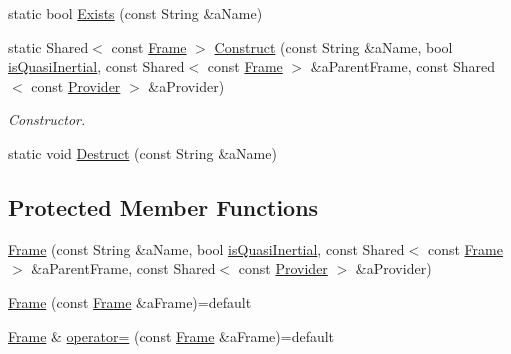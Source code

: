 \begin{DoxyCompactItemize}
\item 
static bool \hyperlink{classlibrary_1_1physics_1_1coord_1_1_frame_aa63cd17cfaf963543a34a15a18c84d40}{Exists} (const String \&a\+Name)
\item 
static Shared$<$ const \hyperlink{classlibrary_1_1physics_1_1coord_1_1_frame}{Frame} $>$ \hyperlink{classlibrary_1_1physics_1_1coord_1_1_frame_acdadad4d650b63c1d4ad05d5268e0b79}{Construct} (const String \&a\+Name, bool \hyperlink{classlibrary_1_1physics_1_1coord_1_1_frame_a894d1ac6152e28dbb749058ca6ffd663}{is\+Quasi\+Inertial}, const Shared$<$ const \hyperlink{classlibrary_1_1physics_1_1coord_1_1_frame}{Frame} $>$ \&a\+Parent\+Frame, const Shared$<$ const \hyperlink{classlibrary_1_1physics_1_1coord_1_1frame_1_1_provider}{Provider} $>$ \&a\+Provider)
\begin{DoxyCompactList}\small\item\em Constructor. \end{DoxyCompactList}\item 
static void \hyperlink{classlibrary_1_1physics_1_1coord_1_1_frame_a2d4229290a0332c70240ebc8b02bd132}{Destruct} (const String \&a\+Name)
\end{DoxyCompactItemize}
\subsection*{Protected Member Functions}
\begin{DoxyCompactItemize}
\item 
\hyperlink{classlibrary_1_1physics_1_1coord_1_1_frame_a6a8410c8b29584fe2c2c78370c72f695}{Frame} (const String \&a\+Name, bool \hyperlink{classlibrary_1_1physics_1_1coord_1_1_frame_a894d1ac6152e28dbb749058ca6ffd663}{is\+Quasi\+Inertial}, const Shared$<$ const \hyperlink{classlibrary_1_1physics_1_1coord_1_1_frame}{Frame} $>$ \&a\+Parent\+Frame, const Shared$<$ const \hyperlink{classlibrary_1_1physics_1_1coord_1_1frame_1_1_provider}{Provider} $>$ \&a\+Provider)
\item 
\hyperlink{classlibrary_1_1physics_1_1coord_1_1_frame_abacc320c21194a591bf76612d91bafb9}{Frame} (const \hyperlink{classlibrary_1_1physics_1_1coord_1_1_frame}{Frame} \&a\+Frame)=default
\item 
\hyperlink{classlibrary_1_1physics_1_1coord_1_1_frame}{Frame} \& \hyperlink{classlibrary_1_1physics_1_1coord_1_1_frame_a31c2c947b4b27a9873d4eda7816e8247}{operator=} (const \hyperlink{classlibrary_1_1physics_1_1coord_1_1_frame}{Frame} \&a\+Frame)=default
\end{DoxyCompactItemize}
